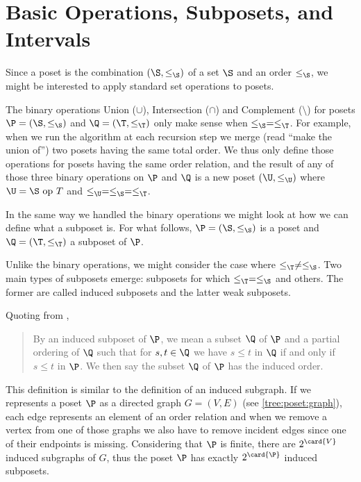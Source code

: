 \section{Basic Operations, Subposets, and Intervals}
\label{tree:poset:sub}


Since a poset is the combination $(\S, \le_{\S})$ of a set $\S$ and an order
$\le_{\S}$, we might be interested to apply standard set operations to posets.

The binary operations Union ($\cup$), Intersection ($\cap$) and Complement
($\setminus$) for posets $\P = (\S, \le_{\S})$ and $\Q = (\T, \le_{\T})$ only make sense
when $\le_{\S} = \le_{\T}$. For example, when we run the algorithm \mergesort at each
recursion step we merge (read ``make the union of'') two posets having the same
total order. We thus only define those operations for posets having the same
order relation, and the result of any of those three binary operations on $\P$
and $\Q$ is a new poset $(\U, \le_{\U})$ where $\U = \S~\text{op}~T$ and $\le_{\U} =
\le_{\S} = \le_{\T}$.


In the same way we handled the binary operations we might look at how we can
define what a subposet is. For what follows, $\P = (\S, \le_{\S})$ is a poset
and $\Q = (\T, \le_{\T})$ a subposet of $\P$.

Unlike the binary operations, we might consider the case where $\le_{\T} \neq
\le_{\S}$. Two main types of subposets emerge: subposets for which $\le_{\T} =
\le_{\S}$ and others. The former are called induced subposets and the latter
weak subposets.

Quoting from \citet*{Stanley:2011:ECV:2124415},

\begin{quotation}

By an induced subposet of $\P$, we mean a subset $\Q$ of $\P$ and a partial
ordering of $\Q$ such that for $s, t \in \Q$ we have $s \leq t$ in $\Q$ if and
only if $s \leq t$ in $\P$. We then say the subset $\Q$ of $\P$ has the induced
order.

\end{quotation}

This definition is similar to the definition of an induced subgraph. If we
represents a poset $\P$ as a directed graph $G = (V, E)$ (see
\ref{tree:poset:graph}), each edge represents an element of an order relation
and when we remove a vertex from one of those graphs we also have to remove
incident edges since one of their endpoints is missing. Considering that $\P$ is
finite, there are $2^{\card{V}}$ induced subgraphs of $G$, thus the poset $\P$ has
exactly $2^{\card{\P}}$ induced subposets.


